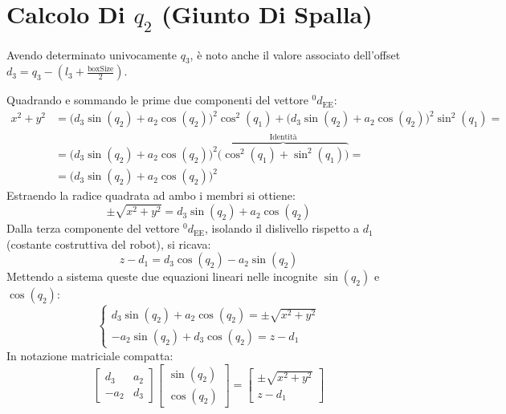 \documentclass[11pt, a4paper]{report}
\begin{document}
\section{Calcolo Di $q_2$ (Giunto Di Spalla)}
Avendo determinato univocamente $q_3$, è noto anche il valore associato dell'offset $d_3 = q_3 - \left(l_3 + \frac{\text{boxSize}}{2}\right)$.

Quadrando e sommando le prime due componenti del vettore ${}^{0}d_{\text{EE}}$:
\begin{align*}
    x^{2} + y^{2} &= \biggl(d_3 \sin(q_2) + a_2 \cos(q_2)\biggr)^{2} \cos^2(q_1) + \biggl(d_3 \sin(q_2) + a_2 \cos(q_2)\biggr)^{2} \sin^2(q_1) = \\
    &= \biggl(d_3 \sin(q_2) + a_2 \cos(q_2)\biggr)^{2} \overbrace{\biggl(\cos^2(q_1) + \sin^2(q_1)\biggr)}^{\text{Identità}} = \\
    &= \biggl(d_3 \sin(q_2) + a_2 \cos(q_2)\biggr)^{2}
\end{align*}
Estraendo la radice quadrata ad ambo i membri si ottiene:
\[
    \pm\sqrt{x^{2} + y^{2}} = d_3 \sin(q_2) + a_2 \cos(q_2)
\]
Dalla terza componente del vettore ${}^{0}d_{\text{EE}}$, isolando il dislivello rispetto a $d_1$ (costante costruttiva del robot), si ricava:
\[
    z - d_1 = d_3 \cos(q_2) - a_2 \sin(q_2)
\]
Mettendo a sistema queste due equazioni lineari nelle incognite $\sin(q_2)$ e $\cos(q_2)$:
\[
    \begin{cases}
        d_{3} \sin(q_2) + a_2 \cos(q_2) = \pm\sqrt{x^{2} + y^{2}}\\
        -a_{2} \sin(q_2) + d_{3} \cos(q_2) = z - d_1
    \end{cases}
\]
In notazione matriciale compatta:
\[
    \begin{bmatrix}
        d_{3} & a_{2} \\
        -a_{2} & d_{3}
    \end{bmatrix}
    \begin{bmatrix}
        \sin(q_2)\\
        \cos(q_2)
    \end{bmatrix}
    =
    \begin{bmatrix}
        \pm \sqrt{x^2+y^2} \\
        z - d_1
    \end{bmatrix}
\]
\end{document}
